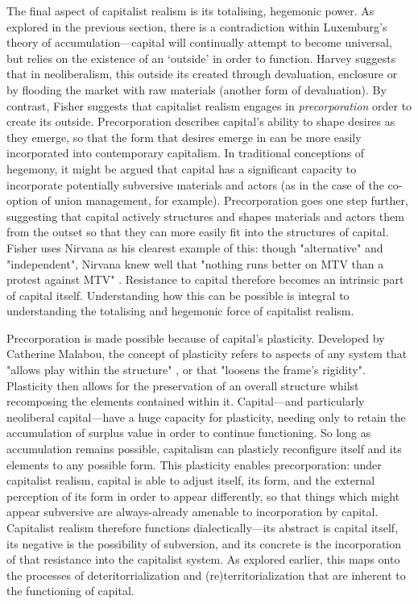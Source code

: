 The final aspect of capitalist realism is its totalising, hegemonic power. As explored in the previous section,  there is a contradiction within Luxemburg's theory of accumulation—capital will continually attempt to become universal, but relies on the existence of an `outside' in order to function. Harvey suggests that in neoliberalism, this outside its created through devaluation, enclosure or by flooding the market with raw materials (another form of devaluation). By contrast, Fisher suggests that capitalist realism engages in \emph{precorporation} order to create its outside. Precorporation describes capital's ability to shape desires as they emerge, so that the form that desires emerge in can be more easily incorporated into contemporary capitalism. In traditional conceptions of hegemony, it might be argued that capital has a significant capacity to incorporate potentially subversive materials and actors (as in the case of the co-option of union management, for example). Precorporation goes one step further, suggesting that capital actively structures and shapes materials and actors them from the outset so that they can more easily fit into the structures of capital. Fisher uses Nirvana as his clearest example of this: though "alternative" and "independent", Nirvana knew well that "nothing runs better on MTV than a protest against MTV" \citep[p. 13]{fisher_capitalist_2009}. Resistance to capital therefore becomes an intrinsic part of capital itself. Understanding how this can be possible is integral to understanding the totalising and hegemonic force of capitalist realism.

Precorporation is made possible because of capital's plasticity. Developed by Catherine Malabou, the concept of plasticity refers to aspects of any system that "allows play within the structure" \citep[p. 44]{malabou_will_2015}, or that "loosens the frame's rigidity". Plasticity then allows for the preservation of an overall structure whilst recomposing the elements contained within it. Capital—and particularly neoliberal capital—have a huge capacity for plasticity, needing only to retain the accumulation of surplus value in order to continue functioning. So long as accumulation remains possible, capitalism can plasticly reconfigure itself and its elements to any possible form. This plasticity enables precorporation:  under capitalist realism, capital is able to adjust itself, its form, and the external perception of its form in order to appear differently, so that things which might appear subversive are always-already amenable to incorporation by capital. Capitalist realism therefore functions dialectically—its abstract is capital itself, its negative is the possibility of subversion, and its concrete is the incorporation of that resistance into the capitalist system. As explored earlier, this maps onto the processes of deteritorrialization and (re)territorialization that are inherent to the functioning of capital.

